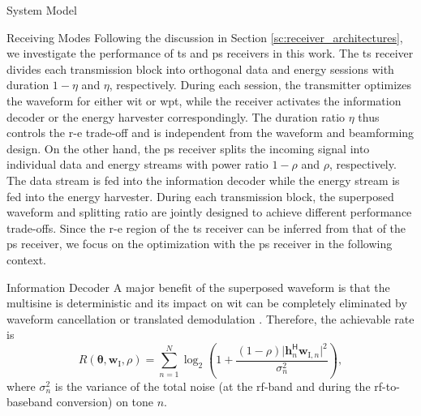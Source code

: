 \begin{section}{System Model}
	\begin{subsection}{Receiving Modes}
		Following the discussion in Section \ref{sc:receiver_architectures}, we investigate the performance of \gls{ts} and \gls{ps} receivers in this work. The \gls{ts} receiver divides each transmission block into orthogonal data and energy sessions with duration $1-\eta$ and $\eta$, respectively. During each session, the transmitter optimizes the waveform for either \gls{wit} or \gls{wpt}, while the receiver activates the information decoder or the energy harvester correspondingly. The duration ratio $\eta$ thus controls the \gls{r-e} trade-off and is independent from the waveform and beamforming design. On the other hand, the \gls{ps} receiver splits the incoming signal into individual data and energy streams with power ratio $1-\rho$ and $\rho$, respectively. The data stream is fed into the information decoder while the energy stream is fed into the energy harvester. During each transmission block, the superposed waveform and splitting ratio are jointly designed to achieve different performance trade-offs.
		Since the \gls{r-e} region of the \gls{ts} receiver can be inferred from that of the \gls{ps} receiver, we focus on the optimization with the \gls{ps} receiver in the following context.
	\end{subsection}


	\begin{subsection}{Information Decoder}
		A major benefit of the superposed waveform is that the multisine is deterministic and its impact on \gls{wit} can be completely eliminated by waveform cancellation or translated demodulation \cite{Clerckx2018b}.
		Therefore, the achievable rate is
		\begin{equation}\label{eq:R}
			R(\boldsymbol{\theta},\mathbf{w}_{\mathrm{I}},\rho) = \sum_{n=1}^N{\log_2\left(1+\frac{(1-\rho)\lvert \mathbf{h}_{n}^\mathsf{H}\mathbf{w}_{\mathrm{I},n} \rvert^2}{\sigma_n^2}\right)},
		\end{equation}
		where $\sigma_n^2$ is the variance of the total noise (at the \gls{rf}-band and during the \gls{rf}-to-baseband conversion) on tone $n$.
	\end{subsection}



\end{section}
